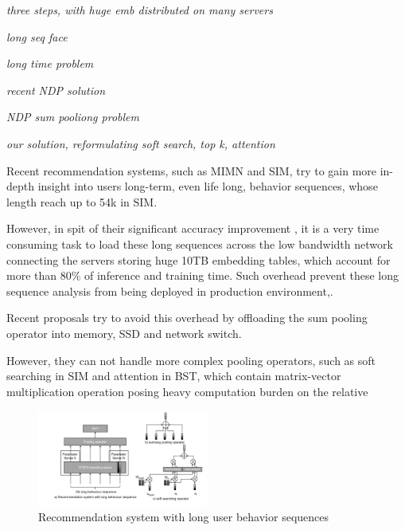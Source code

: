 \documentclass[conference]{IEEEtran}
\begin{document}
\em{three steps, with huge emb distributed on many servers}


\em{long seq face}

\em{long time problem}

\em{recent NDP solution}

\em{NDP sum pooliong problem}

\em{our solution, reformulating soft search, top k, attention}

Recent recommendation systems,
such as MIMN\cite{recsys_mimn_alibaba} and SIM\cite{recsys_sim_alibaba},
try to gain more in-depth insight into users long-term, 
even life long, behavior sequences,
whose length reach up to 54k in SIM\cite{recsys_sim_alibaba}.

However,
in spit of their significant accuracy improvement \cite{recsys_sim_alibaba},
it is a very time consuming task to load these long sequences across the low bandwidth network connecting
the servers storing huge 10TB embedding tables\cite{ recsys_baidu_aibox },
which account for more than 80\% of inference
\cite{recsys_archimp_facebook_hpca20 ,recsys_deeprecsys_facebook_isca20 } 
and training \cite{recsys_traineff_facebook_hpca21 } time.
Such overhead prevent these long sequence analysis from being deployed in production environment\cite{recsys_sim_alibaba},.

Recent proposals try to avoid this overhead by offloading the sum pooling operator into 
memory\cite{recacc_tensordimm_kaist_micro19 ,recacc_recnmp_facebook_isca20 , recacc_tensorcasting_kaist_hpca21 }, 
SSD \cite{recacc_recssd_kaist_asplos21 } and  network switch\cite{ recacc_fafnir_hpca21 }.

However,
they can not handle more complex pooling operators, 
such as soft searching in SIM \cite{recsys_sim_alibaba}
and attention in BST\cite{recsys_bst_alibaba},
which contain matrix-vector multiplication operation posing 
heavy computation burden on the relative 




\begin{figure}[tb]
\centering
\includegraphics[width=0.5\textwidth]  {recsysLong.png}
\caption{Recommendation system with long user behavior sequences}
\label{recsysLong}
\end{figure}
\end{document}
